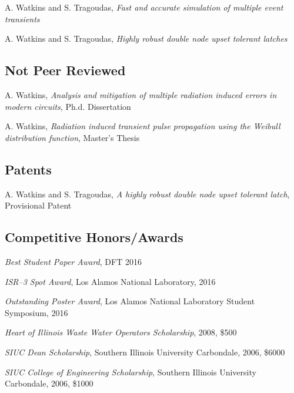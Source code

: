 \documentclass[letterpaper]{article}
\renewenvironment{itemize}{
  \begin{list}{}{
    \setlength{\leftmargin}{1.5em}
  }
}{
  \end{list}
}
\begin{document}
\begin{itemize}
\item A. Watkins and S. Tragoudas, \emph{Fast and accurate simulation of multiple event transients}

\item A. Watkins and S. Tragoudas, \emph{Highly robust double node upset tolerant latches}
\end{itemize}

\subsection*{Not Peer Reviewed}

\begin{itemize}
	\item A. Watkins, \emph{Analysis and mitigation of multiple radiation induced errors in modern circuits}, Ph.d. Dissertation
	
	\item A. Watkins, \emph{Radiation induced transient pulse propagation using the Weibull distribution function}, Master's Thesis
\end{itemize}

\subsection*{Patents}

\begin{itemize}
	\item A. Watkins and S. Tragoudas, \emph{A highly robust double node upset tolerant latch}, Provisional Patent 
\end{itemize}

\subsection*{Competitive Honors/Awards}

\begin{itemize}
	
	\item \emph{Best Student Paper Award}, DFT 2016
	\item \emph{ISR--3 Spot Award}, Los Alamos National Laboratory, 2016
	\item \emph{Outstanding Poster Award}, Los Alamos National Laboratory Student Symposium, 2016
	\item \emph{Heart of Illinois Waste Water Operators Scholarship}, 2008, \$500
	\item \emph{SIUC Dean Scholarship}, Southern Illinois University Carbondale, 2006, \$6000
	\item \emph{SIUC College of Engineering Scholarship}, Southern Illinois University Carbondale, 2006, \$1000
	
\end{itemize}
\end{document}
